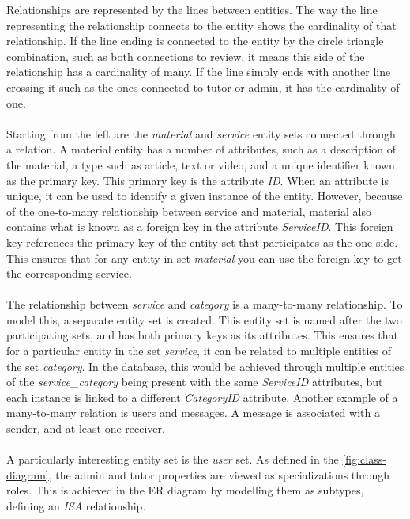 Relationships are represented by the lines between entities.
The way the line representing the relationship connects to the entity shows the cardinality of that relationship.
If the line ending is connected to the entity by the circle triangle combination, such as both connections to review, it means this side of the relationship has a cardinality of many.
If the line simply ends with another line crossing it such as the ones connected to tutor or admin, it has the cardinality of one.
\\\\
Starting from the left are the \textit{material} and \textit{service} entity sets connected through a relation. 
A material entity has a number of attributes, such as a description of the material, a type such as article, text or video, and a unique identifier known as the primary key.
This primary key is the attribute \textit{ID}.
When an attribute is unique, it can be used to identify a given instance of the entity. 
However, because of the one-to-many relationship between service and material, material also contains what is known as a foreign key in the attribute \textit{ServiceID}.
This foreign key references the primary key of the entity set that participates as the one side. 
This ensures that for any entity in set \textit{material} you can use the foreign key to get the corresponding service.
\\\\
The relationship between \textit{service} and \textit{category} is a many-to-many relationship.
To model this, a separate entity set is created.
This entity set is named after the two participating sets, and has both primary keys as its attributes.
This ensures that for a particular entity in the set \textit{service}, it can be related to multiple entities of the set \textit{category}.
In the database, this would be achieved through multiple entities of the \textit{service\_category} being present with the same \textit{ServiceID} attributes, but each instance is linked to a different \textit{CategoryID} attribute.
Another example of a many-to-many relation is users and messages.
A message is associated with a sender, and at least one receiver.
\\\\
A particularly interesting entity set is the \textit{user} set. 
As defined in the \autoref{fig:class-diagram}, the admin and tutor properties are viewed as specializations through roles.
This is achieved in the ER diagram by modelling them as subtypes, defining an \textit{ISA} relationship.
